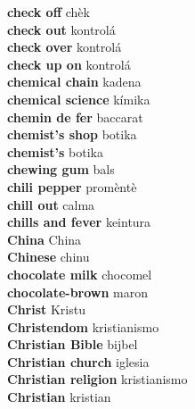 \textbf{ check off  } chèk \\
\textbf{ check out  } kontrolá \\
\textbf{ check over  } kontrolá \\
\textbf{ check up on  } kontrolá \\
\textbf{ chemical chain  } kadena \\
\textbf{ chemical science  } kímika \\
\textbf{ chemin de fer  } baccarat \\
\textbf{ chemist’s shop  } botika \\
\textbf{ chemist’s  } botika \\
\textbf{ chewing gum  } bals \\
\textbf{ chili pepper  } promèntè \\
\textbf{ chill out  } calma \\
\textbf{ chills and fever  } keintura \\
\textbf{ China  } China \\
\textbf{ Chinese  } chinu \\
\textbf{ chocolate milk  } chocomel \\
\textbf{ chocolate-brown  } maron \\
\textbf{ Christ  } Kristu \\
\textbf{ Christendom  } kristianismo \\
\textbf{ Christian Bible  } bijbel \\
\textbf{ Christian church  } iglesia \\
\textbf{ Christian religion  } kristianismo \\
\textbf{ Christian  } kristian \\
